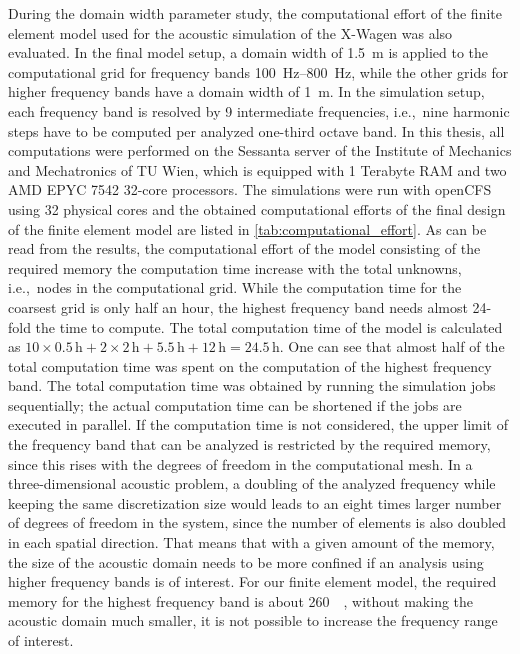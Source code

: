 {During the domain width parameter study, the computational effort of the finite element model used for the acoustic simulation of the X-Wagen was also evaluated. In the final model setup, a domain width of \SI{1.5}{\meter} is applied to the computational grid for frequency bands \SIrange{100}{800}{\hertz}, while the other grids for higher frequency bands have a domain width of \SI{1}{\meter}. In the simulation setup, each frequency band is resolved by 9 intermediate frequencies, i.e.,\ nine harmonic steps have to be computed per analyzed one-third octave band. In this thesis, all computations were performed on the Sessanta server of the Institute of Mechanics and Mechatronics of TU Wien, which is equipped with 1 Terabyte RAM and two AMD EPYC 7542 32-core processors. The simulations were run with openCFS using 32 physical cores and the obtained computational efforts of the final design of the finite element model are listed in \cref{tab:computational_effort}. As can be read from the results, the computational effort of the model consisting of the required memory the computation time increase with the total unknowns, i.e.,\ nodes in the computational grid. While the computation time for the coarsest grid is only half an hour, the highest frequency band needs almost 24-fold the time to compute. The total computation time of the model is calculated as $10\times 0.5\,\text{h} + 2\times 2\,\text{h} + 5.5\,\text{h} + 12\,\text{h} = 24.5\,\text{h}$. One can see that almost half of the total computation time was spent on the computation of the highest frequency band. The total computation time was obtained by running the simulation jobs sequentially; the actual computation time can be shortened if the jobs are executed in parallel. If the computation time is not considered, the upper limit of the frequency band that can be analyzed is restricted by the required memory, since this rises with the degrees of freedom in the computational mesh. In a three-dimensional acoustic problem, a doubling of the analyzed frequency while keeping the same discretization size would leads to an eight times larger number of degrees of freedom in the system, since the number of elements is also doubled in each spatial direction. That means that with a given amount of the memory, the size of the acoustic domain needs to be more confined if an analysis using higher frequency bands is of interest. For our finite element model, the required memory for the highest frequency band is about \SI{260}{\giga\byte}, without making the acoustic domain much smaller, it is not possible to increase the frequency range of interest.

}
